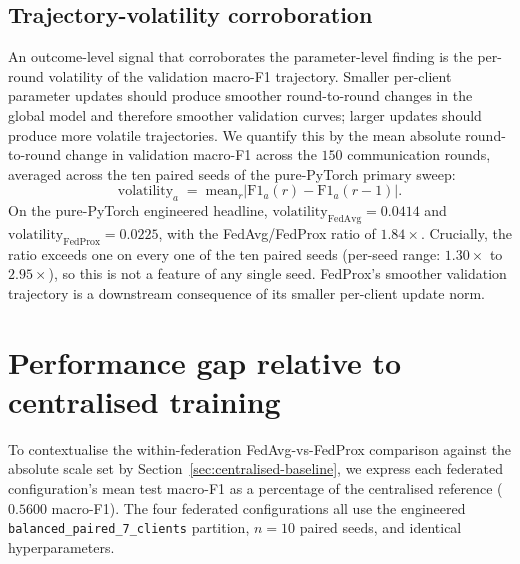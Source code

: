 \documentclass[11pt,a4paper]{report}
\begin{document}
\subsection{Trajectory-volatility corroboration}
\label{sec:update-norms-volatility}

An outcome-level signal that corroborates the parameter-level
finding is the per-round volatility of the validation
macro-F1 trajectory. Smaller per-client parameter updates
should produce smoother round-to-round changes in the global
model and therefore smoother validation curves; larger
updates should produce more volatile trajectories. We
quantify this by the mean absolute round-to-round change
in validation macro-F1 across the $150$ communication rounds,
averaged across the ten paired seeds of the pure-PyTorch
primary sweep:
\[
\text{volatility}_a \;=\;
\mathrm{mean}_r \big|\mathrm{F1}_a(r) - \mathrm{F1}_a(r-1)\big|.
\]
On the pure-PyTorch engineered headline,
$\text{volatility}_{\mathrm{FedAvg}} = 0.0414$ and
$\text{volatility}_{\mathrm{FedProx}} = 0.0225$, with the
FedAvg/FedProx ratio of $1.84\times$. Crucially, the ratio
exceeds one on every one of the ten paired seeds (per-seed
range: $1.30\times$ to $2.95\times$), so this is not a feature
of any single seed. FedProx's smoother validation trajectory
is a downstream consequence of its smaller per-client update
norm.

\section{Performance gap relative to centralised training}
\label{sec:federation-tax}

To contextualise the within-federation FedAvg-vs-FedProx
comparison against the absolute scale set by
Section~\ref{sec:centralised-baseline}, we express each
federated configuration's mean test macro-F1 as a percentage of
the centralised reference ($0.5600$ macro-F1). The four
federated configurations all use the engineered
\texttt{balanced\_paired\_7\_clients} partition, $n = 10$ paired
seeds, and identical hyperparameters.
\end{document}

